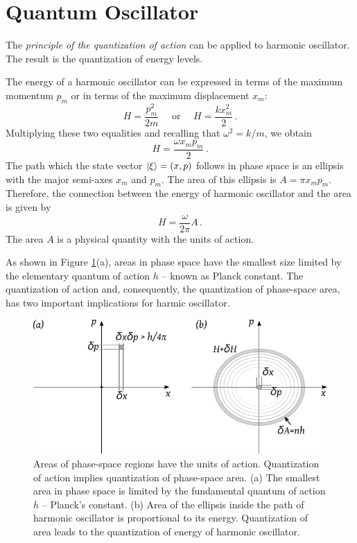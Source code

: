 \section{Quantum Oscillator}\label{sec:QuantumOscillator}
The \emph{principle of the quantization of action} can be applied to harmonic oscillator. The result is the quantization of energy levels. 

The energy of a harmonic oscillator can be expressed in terms of the maximum momentum $p_m$ or in terms of the maximum displacement $x_m$:
\[
H = \frac{p_m^2}{2m}\quad\textrm{ or }\quad H=\frac{kx_m^2}{2}\,.
\]
Multiplying these two equalities and recalling that $\omega^2=k/m$, we obtain
\[
H = \frac{\omega x_m p_m}{2}\,.
\]
The path which the state vector $|{\xi}\rangle=(x,p)$ follows in phase space is an ellipsis with the major semi-axes $x_m$ and $p_m$. The area of this ellipsis is $A=\pi x_m p_m$. Therefore, the connection between the energy of harmonic oscillator and the area is given by
\[
H=\frac{\omega}{2\pi}A\,.
\]
The area $A$ is a physical quantity with the units of action.

As shown in Figure \ref{fig:phaseSpaceQuantum}(a), areas in phase space have the smallest size limited by the elementary quantum of action $h$ -- known as Planck constant. The quantization of action and, consequently, the quantization of phase-space area, has two important implications for harmic oscillator.
\begin{figure}[htbp]
	\centering
	\includegraphics[scale=1.0]{phaseSpaceQuantum}
	\caption{Areas of phase-space regions have the units of action. Quantization of action implies quantization of phase-space area. (a) The smallest area in phase space is limited by the fundamental quantum of action $h$ -- Planck's constant. (b) Area of the ellipsis inside the path of harmonic oscillator is proportional to its energy. Quantization of area leads to the quantization of energy of harmonic oscillator.}
	\label{fig:phaseSpaceQuantum}
\end{figure}

